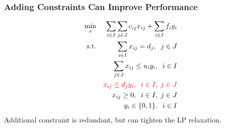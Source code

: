 \documentclass[12pt,handout]{beamer}
\begin{document}
\begin{frame}
\frametitle{Adding Constraints Can Improve Performance}
\begin{eqnarray}
\min_{x} && \sum_{i \in I} \sum_{j \in J} c_{ij} x_{ij} + \sum_{i \in I} f_i y_i \nonumber \\
\mbox{s.t.} && \sum_{i \in I} x_{ij} = d_j,\;\;j \in J \nonumber \\
&& \sum_{j \in J} x_{ij} \le u_i y_i,\;\;i \in I \nonumber \\
&& {\color{red} x_{ij} \le d_j y_i,\;\;i \in I,\;j \in J} \nonumber \\
&& x_{ij} \ge 0, \;\;i \in I,\;j \in J \nonumber \\
&& y_i \in \{0, 1\},\;\;i \in I \nonumber
\end{eqnarray}
Additional constraint is redundant, but can tighten the LP relaxation.
\end{frame}
\end{document}
